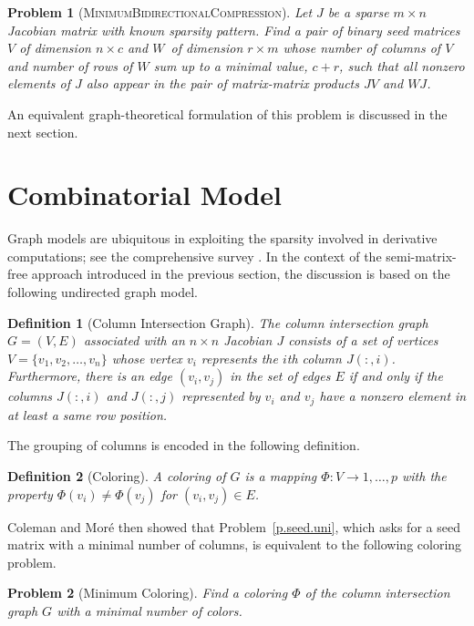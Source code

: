 \documentclass[12pt, oneside]{book}
\newtheorem{problem}{Problem}
\newtheorem{definition}{Definition}
\newcommand{\col}{\ensuremath{c}}
\newcommand{\row}{\ensuremath{r}}
\newcommand{\MinBidCom}{\textsc{MinimumBidirectionalCompression}}
\begin{document}
\begin{problem}[\MinBidCom]
\label{p.seed.bid} Let $J$ be a sparse ${m\times n}$ Jacobian matrix with known sparsity
pattern. Find a pair of binary seed matrices $V$ of dimension $n\times \col$ and $W$~of
dimension $\row \times m$ whose number of columns of $V$ and number of rows of $W$ sum up
to a minimal value, $\col + \row$, such that all nonzero elements of $J$ also appear in
the pair of matrix-matrix products $JV$ and $WJ$.
\end{problem}

An equivalent graph-theoretical formulation of this problem is discussed in the next
section.

\section{Combinatorial Model}
\label{s.modeling}
Graph models are ubiquitous in exploiting the sparsity involved in derivative
computations; see the comprehensive survey \cite{Gebremedhin05whatcolor}. In the context of the
semi-matrix-free approach introduced in the previous section, the discussion is based on
the following undirected graph model.
%
\begin{definition}[Column Intersection Graph]
\label{d:cig}
The column intersection graph $G = (V,E)$ associated with an $n \times n$ Jacobian $J$
consists of a set of vertices $V=\{v_1, v_2, \dots, v_n\}$ whose vertex $v_i$ represents
the $i$th column $J(:,i)$. Furthermore, there is an edge $(v_i,v_j)$ in the set of edges
$E$ if and only if the columns $J(:,i)$ and $J(:,j)$ represented by $v_i$ and $v_j$ have
a nonzero element in at least a same row position.
\end{definition}

The grouping of columns is encoded in the following definition.
%
\begin{definition}[Coloring]
A coloring of $G$ is a mapping $\Phi : V \to {1, \dots, p}$ with the property
$\Phi(v_i)\neq \Phi(v_j)$ for $(v_i,v_j) \in E$.
\end{definition}
%
Coleman and Mor\'{e} \cite{Coleman1983EoS} then showed that Problem~\ref{p.seed.uni}, which
asks for a seed matrix with a minimal number of columns, is equivalent to the following
coloring problem.
%
\begin{problem}[Minimum Coloring]
\label{p:mincol}
%
Find a coloring $\Phi$ of the column intersection graph $G$ with a minimal number of
colors.
\end{problem}
\end{document}
